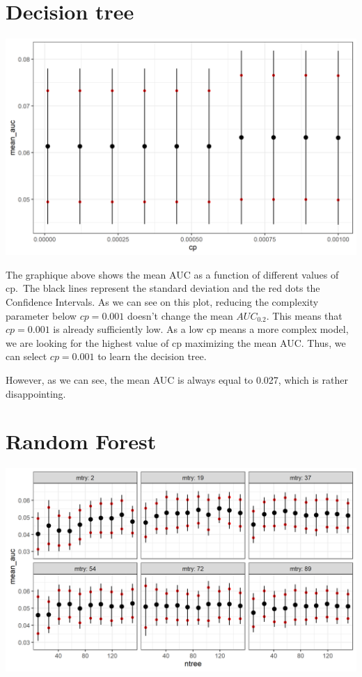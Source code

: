 \documentclass[
  12pt,
  oneside]{report}
\begin{document}
\hypertarget{decision-tree}{%
\section{Decision tree}\label{decision-tree}}

\includegraphics[width=30.15in]{data/cv_dt}

The graphique above shows the mean AUC as a function of different values of cp.~The black lines represent the standard deviation and the red dots the Confidence Intervals. As we can see on this plot, reducing the complexity parameter below \(cp = 0.001\) doesn't change the mean \(AUC_{0.2}\). This means that \(cp = 0.001\) is already sufficiently low. As a low cp means a more complex model, we are looking for the highest value of cp maximizing the mean AUC. Thus, we can select \(cp = 0.001\) to learn the decision tree.

However, as we can see, the mean AUC is always equal to 0.027, which is rather disappointing.

\hypertarget{random-forest}{%
\section{Random Forest}\label{random-forest}}

\includegraphics[width=30.03in]{data/cv_rf}
\end{document}
